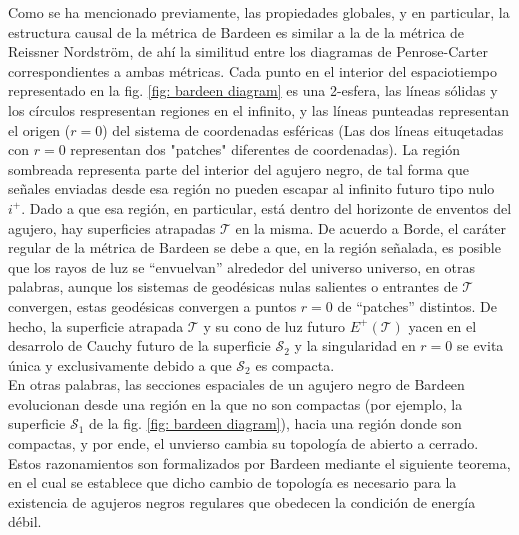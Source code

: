\documentclass[16pt,a4paper]{article}
\numberwithin{equation}{section}
\theoremstyle{definition}
\begin{document}
Como se ha mencionado previamente, las propiedades globales, y en particular, la estructura causal de la métrica de Bardeen es similar a la de la métrica de Reissner Nordström, de ahí la similitud entre los diagramas de Penrose-Carter correspondientes a ambas métricas. Cada punto en el interior del espaciotiempo representado en la fig. \ref{fig: bardeen diagram} es una 2-esfera, las líneas sólidas y los círculos respresentan regiones en el infinito, y las líneas punteadas representan el origen ($r = 0$) del sistema de coordenadas esféricas (Las dos líneas eituqetadas con $r = 0$ representan dos "patches" diferentes de coordenadas). La región sombreada representa parte del interior del agujero negro, de tal forma que señales enviadas desde esa región no pueden escapar al infinito futuro tipo nulo $i^{+}$. Dado a que esa región, en particular, está dentro del horizonte de enventos del agujero, hay superficies atrapadas $\mathcal{T}$ en la misma. De acuerdo a Borde, el caráter regular de la métrica de Bardeen se debe a que, en la región señalada, es posible que los rayos de luz se ``envuelvan'' alrededor del universo universo, en otras palabras, aunque los sistemas de geodésicas nulas salientes o entrantes de $\mathcal{T}$ convergen, estas geodésicas convergen a puntos $r = 0$ de ``patches'' distintos. De hecho, la superficie atrapada $\mathcal{T}$ y su cono de luz futuro $E^{+}(\mathcal{T})$ yacen en el desarrolo de Cauchy futuro de la superficie $\mathcal{S}_{2}$ y la singularidad en $r = 0$ se evita única y exclusivamente debido a que $\mathcal{S}_{2}$ es compacta.\\

En otras palabras, las secciones espaciales de un agujero negro de Bardeen evolucionan desde una región en la que no son compactas (por ejemplo, la superficie $\mathcal{S}_{1}$ de la fig. \ref{fig: bardeen diagram}), hacia una región donde son compactas, y por ende, el unvierso cambia su topología de abierto a cerrado. Estos razonamientos son formalizados por Bardeen mediante el siguiente teorema, en el cual se establece que dicho cambio de topología es necesario para la existencia de agujeros negros regulares que obedecen la condición de energía débil.\\
\end{document}
